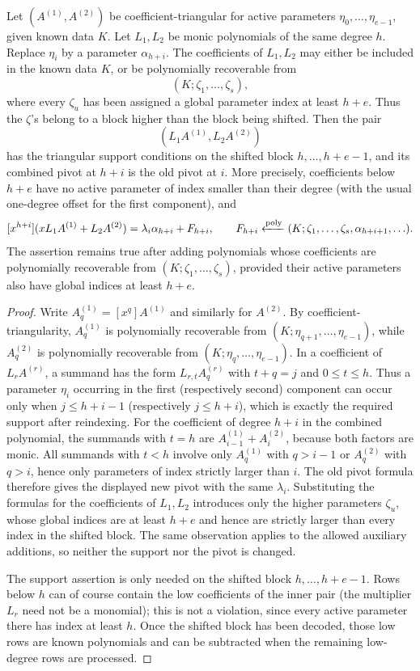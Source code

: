 \begin{lemma}
\label{lem:triangular-shift}
Let $(A^{(1)},A^{(2)})$ be coefficient-triangular for active
parameters $\eta_0,\ldots,\eta_{e-1}$, given known data $K$.
Let $L_1,L_2$ be monic polynomials of the same degree $h$.  Replace $\eta_i$
by a parameter $\alpha_{h+i}$.  The coefficients of $L_1,L_2$ may either be
included in the known data $K$, or be polynomially recoverable from
\[
       (K;\zeta_1,\ldots,\zeta_s),
\]
where every $\zeta_u$ has been assigned a global parameter index at least
$h+e$.  Thus the $\zeta$'s belong to a block higher than the block being
shifted.  Then the pair
\[
       (L_1A^{(1)},L_2A^{(2)})
\]
has the triangular support conditions on the shifted block
$h,\ldots,h+e-1$, and its combined pivot at $h+i$ is the old pivot at
$i$.  More precisely, coefficients below $h+e$ have no active parameter
of index smaller than their degree (with the usual one-degree offset for
the first component), and
\[
 [x^{h+i}](xL_1A^{(1)}+L_2A^{(2)})
   =\lambda_i\alpha_{h+i}+F_{h+i},
   \qquad F_{h+i}\mathrel{\xleftarrow{\mathrm{poly}}}
      (K;\zeta_1,\ldots,\zeta_s,\alpha_{h+i+1},\ldots).
\]
The assertion remains true after adding polynomials whose coefficients are
polynomially recoverable from $(K;\zeta_1,\ldots,\zeta_s)$, provided their
active parameters also have global indices at least $h+e$.
\end{lemma}
\begin{proof}
Write $A^{(1)}_q=[x^q]A^{(1)}$ and similarly for $A^{(2)}$.  By
coefficient-triangularity, $A^{(1)}_q$ is polynomially recoverable from
$(K;\eta_{q+1},\ldots,\eta_{e-1})$, while $A^{(2)}_q$ is polynomially
recoverable from $(K;\eta_q,\ldots,\eta_{e-1})$.
In a coefficient of $L_rA^{(r)}$, a summand has the form
$L_{r,t}A^{(r)}_q$ with $t+q=j$ and $0\le t\le h$.  Thus a parameter
$\eta_i$ occurring in the first (respectively second) component can occur
only when $j\le h+i-1$ (respectively $j\le h+i$), which is exactly the
required support after reindexing.
For the coefficient of degree $h+i$ in the combined polynomial, the
summands with $t=h$ are
$A^{(1)}_{i-1}+A^{(2)}_i$, because both factors are monic.  All summands
with $t<h$ involve only $A^{(1)}_q$ with $q>i-1$ or $A^{(2)}_q$ with
$q>i$, hence only parameters of index strictly larger than $i$.  The old
    pivot formula therefore gives the displayed new pivot with the same
    $\lambda_i$.  Substituting the formulas for the coefficients of
    $L_1,L_2$ introduces only the higher parameters $\zeta_u$, whose global
    indices are at least $h+e$ and hence are strictly larger than every
    index in the shifted block.  The same observation applies to the allowed
    auxiliary additions, so neither the support nor the pivot is changed.

The support assertion is only needed on the shifted block
$h,\ldots,h+e-1$.  Rows below $h$ can of course contain the low
coefficients of the inner pair (the multiplier $L_r$ need not be a
monomial); this is not a violation, since every active parameter there has
index at least $h$.  Once the shifted block has been decoded, those low
rows are known polynomials and can be subtracted when the remaining
low-degree rows are processed.
\end{proof}

